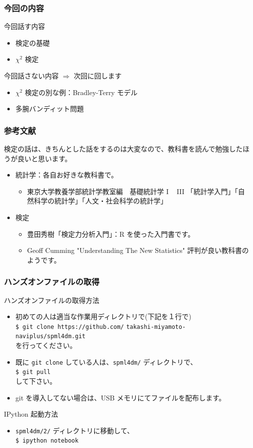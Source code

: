 \documentclass{beamer}
\begin{document}
\begin{frame}
  \frametitle{今回の内容}
  今回話す内容
  \begin{itemize}
    \item 検定の基礎
    \item $\chi^2$ 検定
  \end{itemize}
  今回話さない内容 $\Rightarrow$ 次回に回します
  \begin{itemize}
    \item $\chi^2$ 検定の別な例：Bradley-Terry モデル
    \item 多腕バンディット問題
  \end{itemize}
\end{frame}
\begin{frame}
  \frametitle{参考文献}
  検定の話は、きちんとした話をするのは大変なので、教科書を読んで勉強したほうが良いと思います。\\
  \begin{itemize}
    \item 統計学：各自お好きな教科書で。
    \begin{itemize} 
      \item 東京大学教養学部統計学教室編　基礎統計学 I ~ III 「統計学入門」「自然科学の統計学」「人文・社会科学の統計学」
    \end{itemize}  
    \item 検定
    \begin{itemize}
      \item 豊田秀樹「検定力分析入門」：R を使った入門書です。
      \item Geoff Cumming "Understanding The New Statistics" 評判が良い教科書のようです。
    \end{itemize}
  \end{itemize}
\end{frame}
\begin{frame}[fragile]
  \frametitle{ハンズオンファイルの取得}
  ハンズオンファイルの取得方法
  \begin{itemize}
    \item 初めての人は適当な作業用ディレクトリで(下記を１行で) \\ \texttt{\$ git clone https://github.com/} \texttt{takashi-miyamoto-naviplus/spml4dm.git} \\を行ってください。
    \item 既に \texttt{git clone} している人は、\texttt{spml4dm/} ディレクトリで、\\ \texttt{\$ git pull} \\ して下さい。
    \item git を導入してない場合は、USB メモリにてファイルを配布します。
  \end{itemize}
  IPython 起動方法
  \begin{itemize}
    \item \texttt{spml4dm/2/} ディレクトリに移動して、\\
    \texttt{\$ ipython notebook}
  \end{itemize}
\end{frame}
\end{document}
